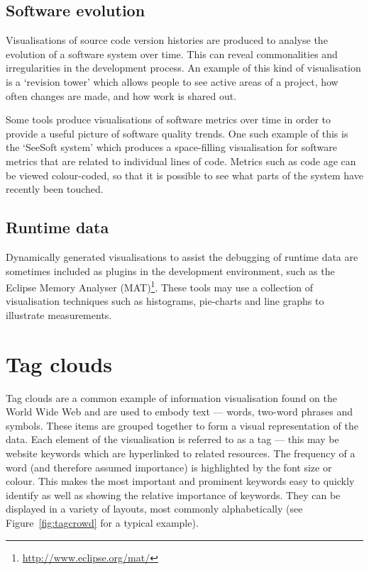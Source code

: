 \subsection{Software evolution}

Visualisations of source code version histories are produced to analyse the evolution of a software system over time. This can reveal commonalities and irregularities in the development process. An example of this kind of visualisation is a `revision tower' \citep{taylor02} which allows people to see active areas of a project, how often changes are made, and how work is shared out.

Some tools produce visualisations of software metrics over time in order to provide a useful picture of software quality trends. One such example of this is the `SeeSoft system'\citep{eick92} which produces a space-filling visualisation for software metrics that are related to individual lines of code. Metrics such as code age can be viewed colour-coded, so that it is possible to see what parts of the system have recently been touched.

\subsection{Runtime data}

Dynamically generated visualisations to assist the debugging of runtime data are sometimes included as plugins in the development environment, such as the Eclipse Memory Analyser (MAT)\footnote{\url{http://www.eclipse.org/mat/}}. These tools may use a collection of visualisation techniques such as histograms, pie-charts and line graphs to illustrate measurements.

\section{Tag clouds}\label{sect:tagclouds}

Tag clouds are a common example of information visualisation found on the World Wide Web and are used to embody text --- words, two-word phrases and symbols. These items are grouped together to form a visual representation of the data.  Each element of the visualisation is referred to as a tag --- this may be website keywords which are hyperlinked to related resources. The frequency of a word (and therefore assumed importance) is highlighted by the font size or colour.  This makes the most important and prominent keywords easy to quickly identify as well as showing the relative importance of keywords. They can be displayed in a variety of layouts, most commonly alphabetically (see Figure~\vref{fig:tagcrowd} for a typical example).

